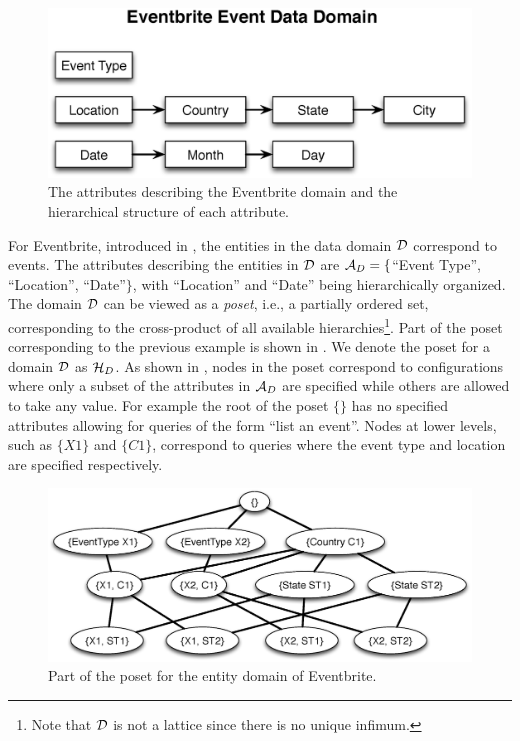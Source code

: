 \begin{figure}[h]
	\begin{center}
	\includegraphics[clip,scale=0.33]{figs/eventsDomain.eps}
	\vspace{-10pt}
	\caption{The attributes describing the Eventbrite domain and the hierarchical structure of each attribute.}
	\label{fig:eventsdomain}
	\end{center}
	\vspace{-20pt}
\end{figure}
\fi
\ifpaper
For Eventbrite, introduced in , the entities in the data domain $\mathcal{D}$ correspond to events. The attributes describing the entities in $\mathcal{D}$ are $\mathcal{A}_D = \{$``Event Type'', ``Location'', ``Date''$\}$, with ``Location'' and ``Date'' being hierarchically organized.
\fi
The domain $\mathcal{D}$ can be viewed as a {\em poset}, i.e., a partially ordered set, corresponding to the cross-product of all available hierarchies\footnote{Note that $\mathcal{D}$ is not a lattice since there is no unique infimum.}. Part of the poset corresponding to the previous example is shown in . We denote the poset for a domain $\mathcal{D}$ as $\mathcal{H}_D$. As shown in , nodes in the poset correspond to configurations where only a subset of the attributes in $\mathcal{A}_D$ are specified while others are allowed to take any value. For example the root of the poset $\{\}$ has no specified attributes allowing for queries of the form ``list an event''. Nodes at lower levels, such as $\{X1\}$ and $\{C1\}$, correspond to queries where the event type and location are specified respectively. 

\begin{figure}[h]
	\begin{center}
	\includegraphics[clip,scale=0.3]{figs/eventsExLattice.eps}
	\caption{Part of the poset for the entity domain of Eventbrite.}
	\label{fig:eventslattice}
	\vspace{-20pt}
	\end{center}
\end{figure}


